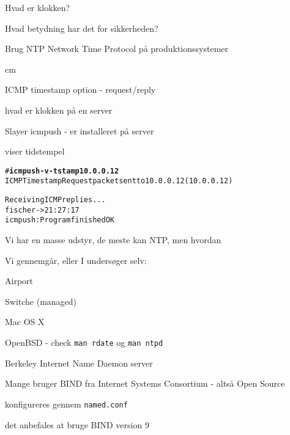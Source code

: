 \documentclass[Screen16to9,17pt]{foils}
\begin{document}


\begin{list1}
\item Hvad er klokken?
\item Hvad betydning har det for sikkerheden?
\item Brug NTP Network Time Protocol på produktionssystemer
\end{list1}



 cm

\begin{list1}
  \item ICMP timestamp option - request/reply
\item hvad er klokken på en server
\item Slayer icmpush - er installeret på server
\item viser tidstempel
\end{list1}

\begin{alltt}
# {\bfseries icmpush -v -tstamp 10.0.0.12}
ICMP Timestamp Request packet sent to 10.0.0.12 (10.0.0.12)

Receiving ICMP replies ...
fischer         -> 21:27:17
icmpush: Program finished OK
\end{alltt}



\begin{list1}
\item Vi har en masse udstyr, de meste kan NTP, men hvordan
\item Vi gennemgår, eller I undersøger selv:
\begin{list2}
\item Airport
\item Switche (managed)
\item Mac OS X
\item OpenBSD - check \verb+man rdate+ og \verb+man ntpd+
\end{list2}
\end{list1}


\begin{list1}
\item Berkeley Internet Name Daemon server
\item Mange bruger BIND fra Internet Systems Consortium
   - altså Open Source
\item konfigureres gennem \verb+named.conf+
\item det anbefales at bruge BIND version 9
\end{list1}
\end{document}
